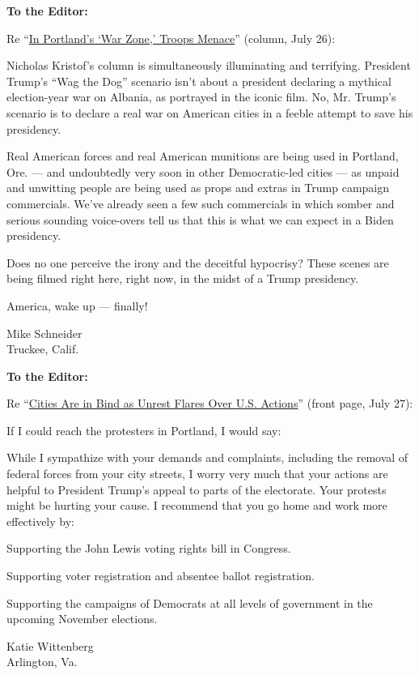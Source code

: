 \textbf{To the Editor:}

Re
``\href{https://www.nytimes3xbfgragh.onion/2020/07/25/opinion/sunday/portland-protest-federal-troops.html}{In
Portland's `War Zone,' Troops Menace}'' (column, July 26):

Nicholas Kristof's column is simultaneously illuminating and terrifying.
President Trump's ``Wag the Dog'' scenario isn't about a president
declaring a mythical election-year war on Albania, as portrayed in the
iconic film. No, Mr. Trump's scenario is to declare a real war on
American cities in a feeble attempt to save his presidency.

Real American forces and real American munitions are being used in
Portland, Ore. --- and undoubtedly very soon in other Democratic-led
cities --- as unpaid and unwitting people are being used as props and
extras in Trump campaign commercials. We've already seen a few such
commercials in which somber and serious sounding voice-overs tell us
that this is what we can expect in a Biden presidency.

Does no one perceive the irony and the deceitful hypocrisy? These scenes
are being filmed right here, right now, in the midst of a Trump
presidency.

America, wake up --- finally!

Mike Schneider\\
Truckee, Calif.

\textbf{To the Editor:}

Re
``\href{https://www.nytimes3xbfgragh.onion/2020/07/26/us/protests-portland-seattle-trump.html}{Cities
Are in Bind as Unrest Flares Over U.S. Actions}'' (front page, July 27):

If I could reach the protesters in Portland, I would say:

While I sympathize with your demands and complaints, including the
removal of federal forces from your city streets, I worry very much that
your actions are helpful to President Trump's appeal to parts of the
electorate. Your protests might be hurting your cause. I recommend that
you go home and work more effectively by:

Supporting the John Lewis voting rights bill in Congress.

Supporting voter registration and absentee ballot registration.

Supporting the campaigns of Democrats at all levels of government in the
upcoming November elections.

Katie Wittenberg\\
Arlington, Va.

